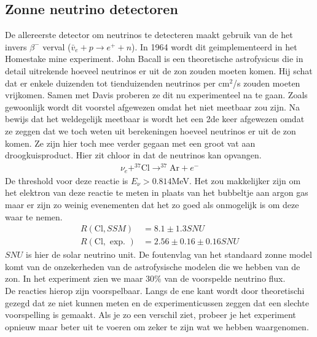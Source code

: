 \documentclass[../main.tex]{subfiles}
\begin{document}
\subsection{Zonne neutrino detectoren}%
\label{sub:zonne_neutrino_detectoren}

De allereerste detector om neutrinos te detecteren maakt gebruik van de het invers $\beta^-$ verval ($\bar{v}_{e}+p\rightarrow e^{+}+n$). In 1964 wordt dit geimplementeerd in het Homestake mine experiment. John Bacall is een theoretische astrofysicus die in detail uitrekende hoeveel neutrinos er uit de zon zouden moeten komen. Hij schat dat er enkele duizenden tot tienduizenden neutrinos per cm$^2$/s zouden moeten vrijkomen. Samen met Davis proberen ze dit nu experimenteel na te gaan. Zoals gewoonlijk wordt dit voorstel afgewezen omdat het niet meetbaar zou zijn. Na bewijs dat het weldegelijk meetbaar is wordt het een 2de keer afgewezen omdat ze zeggen dat we toch weten uit berekeningen hoeveel neutrinos er uit de zon komen. Ze zijn hier toch mee verder gegaan met een groot vat aan droogkuisproduct. Hier zit chloor in dat de neutrinos kan opvangen.
\begin{equation}
    \begin{aligned}
        \label{eq:cl_neutrino_capture}
        \nu_{e}+^{37} \mathrm{Cl} \rightarrow^{37} \mathrm{Ar}+e^{-}
    \end{aligned}
\end{equation}
De threshold voor deze reactie is $E_\nu > 0.814$MeV. Het zou makkelijker zijn om het elektron van deze reactie te meten in plaats van het bubbeltje aan argon gas maar er zijn zo weinig evenementen dat het zo goed als onmogelijk is om deze waar te nemen.
\begin{equation}
    \begin{aligned}
        \label{eq:homestake_mine_exp}
        R(\mathrm{Cl}, S S M) &=8.1 \pm 1.3 S N U \\
        R(\mathrm{Cl}, \text { exp. }) &=2.56 \pm 0.16 \pm 0.16 S N U
    \end{aligned}
\end{equation}
$SNU$ is hier de solar neutrino unit. De foutenvlag van het standaard zonne model komt van de onzekerheden van de astrofysische modelen die we hebben van de zon. In het experiment zien we maar $30\%$ van de voorspelde neutrino flux.\\
De reacties hierop zijn voorspelbaar. Langs de ene kant wordt door theoretischi gezegd dat ze niet kunnen meten en de experimenticussen zeggen dat een slechte voorspelling is gemaakt. Als je zo een verschil ziet, probeer je het experiment opnieuw maar beter uit te voeren om zeker te zijn wat we hebben waargenomen.\\
\end{document}
